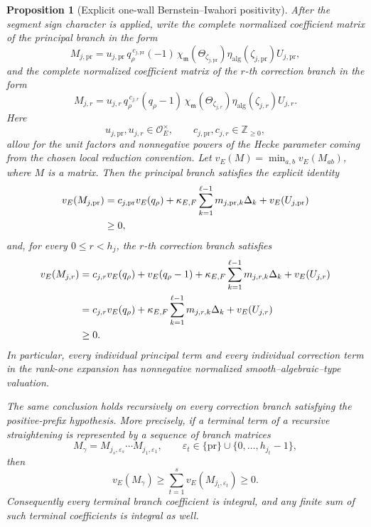 \documentclass[12pt]{article}
\newtheorem{proposition}[theorem]{Proposition}
\theoremstyle{definition}
\theoremstyle{remark}
\newcommand{\Ocoeff}{\mathcal O_E}
\begin{document}
\begin{proposition}[Explicit one-wall Bernstein--Iwahori positivity]
After the segment sign character is applied, write the complete normalized
coefficient matrix of the principal branch in the form
\begin{equation}\label{eq:one-wall-principal-complete-coefficient}
 M_{j,\mathrm{pr}}
 =
 u_{j,\mathrm{pr}}\,
 q_\rho^{\,c_{j,\mathrm{pr}}}
 (-1)\,
 \chi_{\mathfrak m}
 \!\left(\Theta_{\zeta_{j,\mathrm{pr}}}\right)
 \eta_{\mathrm{alg}}
 \!\left(\zeta_{j,\mathrm{pr}}\right)
 U_{j,\mathrm{pr}},
\end{equation}
and the complete normalized coefficient matrix of the \(r\)-th correction
branch in the form
\begin{equation}\label{eq:one-wall-correction-complete-coefficient}
 M_{j,r}
 =
 u_{j,r}\,
 q_\rho^{\,c_{j,r}}
 (q_\rho-1)\,
 \chi_{\mathfrak m}
 \!\left(\Theta_{\zeta_{j,r}}\right)
 \eta_{\mathrm{alg}}
 \!\left(\zeta_{j,r}\right)
 U_{j,r}.
\end{equation}
Here
\[
 u_{j,\mathrm{pr}},u_{j,r}\in\Ocoeff^\times,
 \qquad
 c_{j,\mathrm{pr}},c_{j,r}\in\mathbb Z_{\geq0},
\]
allow for the unit factors and nonnegative powers of the Hecke parameter
coming from the chosen local reduction convention.  Let $v_E(M)=\min_{a,b}v_E(M_{ab})$, where $M$ is a matrix. Then the principal branch satisfies the explicit identity
\begin{align}
 v_E(M_{j,\mathrm{pr}})
 &=
 c_{j,\mathrm{pr}}v_E(q_\rho)
 +
 \kappa_{E,F}
 \sum_{k=1}^{\ell-1}
 m_{j,\mathrm{pr},k}\Delta_k
 +
 v_E(U_{j,\mathrm{pr}})
 \notag\\
 &\geq0,
 \label{eq:one-wall-principal-valuation-nonnegative}
\end{align}
and, for every \(0\leq r<h_j\), the \(r\)-th correction branch satisfies
\begin{align}
 v_E(M_{j,r})
 &=
 c_{j,r}v_E(q_\rho)
 +
 v_E(q_\rho-1)
 +
 \kappa_{E,F}
 \sum_{k=1}^{\ell-1}
 m_{j,r,k}\Delta_k
 +
 v_E(U_{j,r})
 \notag\\
 &=
 c_{j,r}v_E(q_\rho)
 +
 \kappa_{E,F}
 \sum_{k=1}^{\ell-1}
 m_{j,r,k}\Delta_k
 +
 v_E(U_{j,r})
 \notag\\
 &\geq0.
 \label{eq:one-wall-correction-valuation-nonnegative}
\end{align}
In particular, every individual principal term and every individual
correction term in the rank-one expansion has nonnegative normalized
smooth--algebraic--type valuation.

The same conclusion holds recursively on every correction branch satisfying
the positive-prefix hypothesis.  More precisely, if a terminal term of a
recursive straightening is represented by a sequence of branch matrices
\[
 M_{\gamma}
 =
 M_{j_s,\varepsilon_s}\cdots
 M_{j_1,\varepsilon_1},
 \qquad
 \varepsilon_t\in
 \{\mathrm{pr}\}\cup
 \{0,\ldots,h_{j_t}-1\},
\]
then
\begin{equation}\label{eq:one-wall-recursive-product-valuation}
 v_E(M_\gamma)
 \geq
 \sum_{t=1}^s
 v_E(M_{j_t,\varepsilon_t})
 \geq0.
\end{equation}
Consequently every terminal branch coefficient is integral, and any finite
sum of such terminal coefficients is integral as well.
\end{proposition}
\end{document}
